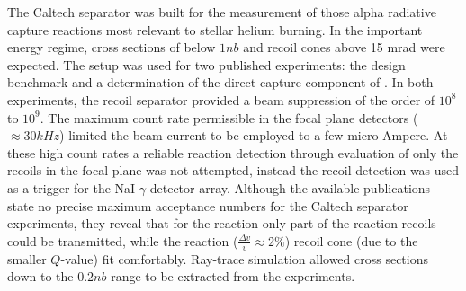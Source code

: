 The Caltech separator was built for the measurement of those alpha radiative capture reactions most relevant to stellar helium burning. In the important energy regime, cross sections of below $1 \unit{nb}$ and recoil cones above 15 mrad were expected. The setup was used for two published experiments: the design benchmark \reac{\alpha}{\gamma} \cite{krem88} and a determination of the direct capture component of \reac{\alpha}{\gamma} \cite{hahn87}. In both experiments, the recoil separator provided a beam suppression of the order of $10^8$ to $10^9$. The maximum count rate permissible in the focal plane detectors ($\approx 30 \unit{kHz}$) limited the beam current to be employed to a few micro-Ampere. At these high count rates a reliable reaction detection through evaluation of only the recoils in the focal plane was not attempted, instead the recoil detection was used as a trigger for the NaI $\gamma$ detector array. Although the available publications state no precise maximum acceptance numbers for the Caltech separator experiments, they reveal that for the \reac{\alpha}{\gamma} reaction only part of the reaction recoils could be transmitted, while the \reac{\alpha}{\gamma} reaction ($\frac{\Delta{}v}{v} \approx 2 \%$) recoil cone (due to the smaller $Q$-value) fit comfortably. Ray-trace simulation allowed cross sections down to the $0.2 \unit{nb}$ range to be extracted from the experiments.\\ 
